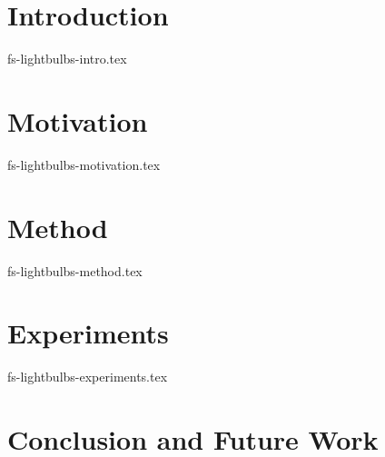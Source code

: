 \documentclass[sigconf]{acmart}
\theoremstyle{remark}
\begin{document}
\maketitle

\thispagestyle{empty}

\section {Introduction}
 {fs-lightbulbs-intro.tex}

\section {Motivation}
 {fs-lightbulbs-motivation.tex}

\section {Method}
 {fs-lightbulbs-method.tex}

\section {Experiments}
 {fs-lightbulbs-experiments.tex}



\section{Conclusion and Future Work}




\end{document}
